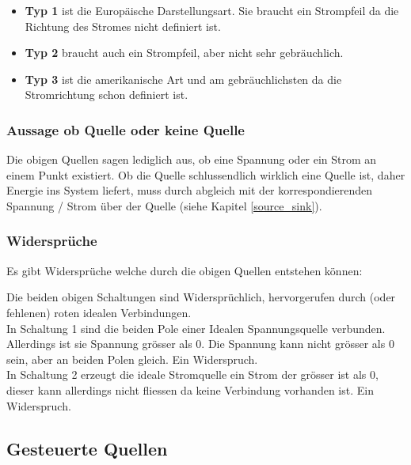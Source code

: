 \begin{itemize}
    \item \textbf{Typ 1} ist die Europäische Darstellungsart. Sie braucht ein Strompfeil da die Richtung des Stromes nicht definiert ist.
    \item \textbf{Typ 2} braucht auch ein Strompfeil, aber nicht sehr gebräuchlich.
    \item \textbf{Typ 3} ist die amerikanische Art und am gebräuchlichsten da die Stromrichtung schon definiert ist.
\end{itemize}

\subsubsection{Aussage ob Quelle oder keine Quelle}

Die obigen Quellen sagen lediglich aus, ob eine Spannung oder ein Strom an einem Punkt existiert. 
Ob die Quelle schlussendlich wirklich eine Quelle ist, daher Energie ins System liefert, muss durch abgleich mit der korrespondierenden Spannung / Strom über der Quelle (siehe Kapitel \ref{source_sink}).\\

\subsubsection{Widersprüche}

Es gibt Widersprüche welche durch die obigen Quellen entstehen können:\\
\begin{center}
    
\end{center}

Die beiden obigen Schaltungen sind Widersprüchlich, hervorgerufen durch (oder fehlenen) roten idealen Verbindungen.\\ 
In Schaltung 1 sind die beiden Pole einer Idealen Spannungsquelle verbunden. 
Allerdings ist sie Spannung grösser als 0. 
Die Spannung kann nicht grösser als 0 sein, aber an beiden Polen gleich. 
Ein Widerspruch.\\
In Schaltung 2 erzeugt die ideale Stromquelle ein Strom der grösser ist als 0, dieser kann allerdings nicht fliessen da keine Verbindung vorhanden ist. 
Ein Widerspruch.\\

\subsection{Gesteuerte Quellen}

